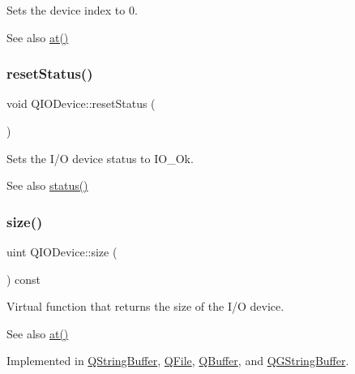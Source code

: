 Sets the device index to 0. \begin{DoxySeeAlso}{See also}
\mbox{\hyperlink{class_q_i_o_device_a0dee1db4a9e506924ccac6982ffdf3df}{at()}} 
\end{DoxySeeAlso}
\mbox{\label{class_q_i_o_device_a1cd60113e530d3202d6dadf12021374c}} 
\subsubsection{\texorpdfstring{resetStatus()}{resetStatus()}}
{\footnotesize\ttfamily void Q\+I\+O\+Device\+::reset\+Status (\begin{DoxyParamCaption}{ }\end{DoxyParamCaption})\hspace{0.3cm}{\ttfamily [inline]}}

Sets the I/O device status to {\ttfamily I\+O\+\_\+\+Ok}.

\begin{DoxySeeAlso}{See also}
\mbox{\hyperlink{class_q_i_o_device_aa9079e73ab2403922c528523cdf2d4ef}{status()}} 
\end{DoxySeeAlso}
\mbox{\label{class_q_i_o_device_a60c4146763625213ac7aa29f1f071592}} 
\subsubsection{\texorpdfstring{size()}{size()}}
{\footnotesize\ttfamily uint Q\+I\+O\+Device\+::size (\begin{DoxyParamCaption}{ }\end{DoxyParamCaption}) const\hspace{0.3cm}{\ttfamily [pure virtual]}}

Virtual function that returns the size of the I/O device. \begin{DoxySeeAlso}{See also}
\mbox{\hyperlink{class_q_i_o_device_a0dee1db4a9e506924ccac6982ffdf3df}{at()}} 
\end{DoxySeeAlso}


Implemented in \mbox{\hyperlink{class_q_string_buffer_a914433284831ecca2b30f80a642d175e}{Q\+String\+Buffer}}, \mbox{\hyperlink{class_q_file_ae6d2d1ffc423701e6acfc7be48a11e73}{Q\+File}}, \mbox{\hyperlink{class_q_buffer_aa064f4e430cdd1babd400982881012a8}{Q\+Buffer}}, and \mbox{\hyperlink{class_q_g_string_buffer_ad7206e39b7cc87a42717ded03d700cd8}{Q\+G\+String\+Buffer}}.

